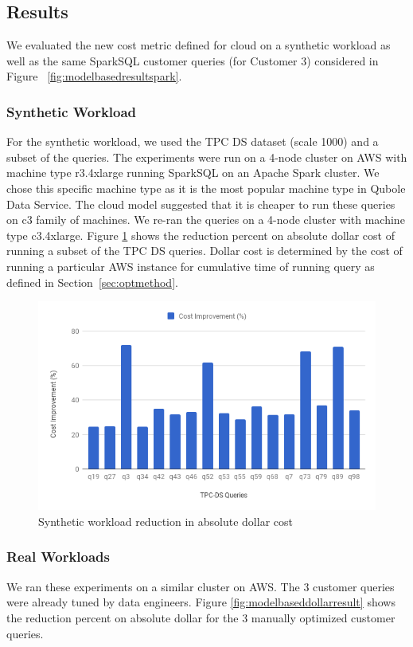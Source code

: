 \subsection{Results}

We evaluated the new cost metric defined for cloud on a synthetic workload as well as the same SparkSQL customer queries (for Customer 3) considered in Figure ~\ref{fig:modelbasedresultspark}. 

\subsubsection*{Synthetic Workload}
For the synthetic workload, we used the TPC DS dataset (scale 1000) and a subset of the queries. The experiments
were run on a 4-node cluster on AWS with machine type r3.4xlarge running SparkSQL on an Apache Spark cluster. We chose this specific machine type as it is the 
most popular machine type in Qubole Data Service. The cloud model suggested that it is cheaper to run these 
queries on c3 family of machines. We re-ran the queries on a 4-node cluster with machine type c3.4xlarge. 
Figure \ref{fig:syntheticcloudmodel} shows the reduction percent on absolute dollar cost of running a subset of the
TPC DS queries. Dollar cost is determined by the cost of running a particular AWS instance for cumulative time of running query as defined in Section~\ref{sec:optmethod}.
\begin{figure}[h]
	\includegraphics[width=\linewidth]{CloudSyn.png}
	\caption{Synthetic workload reduction in absolute dollar cost}
	\label{fig:syntheticcloudmodel}
\end{figure}

\subsubsection*{Real Workloads}
We ran these experiments on a similar cluster on AWS. The 3 customer queries were already tuned by data engineers. Figure \ref{fig:modelbaseddollarresult} shows the reduction percent on absolute dollar for the 3 manually optimized customer queries. 

